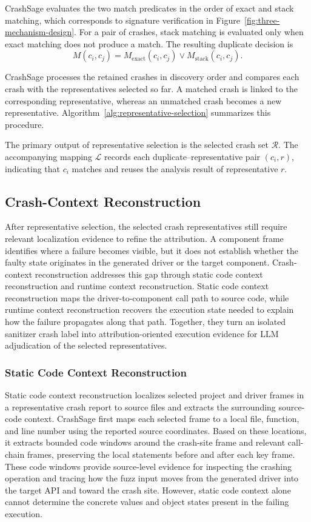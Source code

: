 \documentclass[pdflatex,sn-basic]{sn-jnl}%
\theoremstyle{thmstyleone}%
\theoremstyle{thmstyletwo}%
\theoremstyle{thmstylethree}%
\begin{document}
CrashSage evaluates the two match predicates in the order of exact and stack matching, which corresponds to signature verification in Figure~\ref{fig:three-mechanism-design}.
For a pair of crashes, stack matching is evaluated only when exact matching does not produce a match.
The resulting duplicate decision is
\begin{equation*}
M(c_i,c_j)=
M_{\mathrm{exact}}(c_i,c_j)
\lor M_{\mathrm{stack}}(c_i,c_j).
\end{equation*}

CrashSage processes the retained crashes in discovery order and compares each crash with the representatives selected so far.
A matched crash is linked to the corresponding representative, whereas an unmatched crash becomes a new representative.
Algorithm~\ref{alg:representative-selection} summarizes this procedure.

The primary output of representative selection is the selected crash set \(\mathcal{R}\).
The accompanying mapping \(\mathcal{L}\) records each duplicate--representative pair \((c_i,r)\), indicating that \(c_i\) matches and reuses the analysis result of representative \(r\).


\subsection{Crash-Context Reconstruction}

After representative selection, the selected crash representatives still require relevant localization evidence to refine the attribution.
A component frame identifies where a failure becomes visible, but it does not establish whether the faulty state originates in the generated driver or the target component.
Crash-context reconstruction addresses this gap through static code context reconstruction and runtime context reconstruction.
Static code context reconstruction maps the driver-to-component call path to source code, while runtime context reconstruction recovers the execution state needed to explain how the failure propagates along that path.
Together, they turn an isolated sanitizer crash label into attribution-oriented execution evidence for LLM adjudication of the selected representatives.

\subsubsection{Static Code Context Reconstruction}
Static code context reconstruction localizes selected project and driver frames in a representative crash report to source files and extracts the surrounding source-code context.
CrashSage first maps each selected frame to a local file, function, and line number using the reported source coordinates.
Based on these locations, it extracts bounded code windows around the crash-site frame and relevant call-chain frames, preserving the local statements before and after each key frame.
These code windows provide source-level evidence for inspecting the crashing operation and tracing how the fuzz input moves from the generated driver into the target API and toward the crash site.
However, static code context alone cannot determine the concrete values and object states present in the failing execution.
\end{document}
